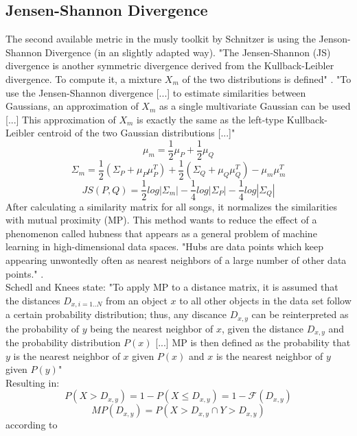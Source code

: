 \subsection{Jensen-Shannon Divergence}
The second available metric in the musly toolkit by Schnitzer is using the Jenson-Shannon Divergence (in an slightly adapted way). "The Jensen-Shannon (JS) divergence is another symmetric divergence derived from the Kullback-Leibler divergence. To compute it, a mixture $X_m$ of the two distributions is defined" \cite[p. 43]{schnitzer1}. "To use the Jensen-Shannon divergence [...] to estimate similarities between Gaussians, an approximation of $X_m$ as a single multivariate Gaussian can be used [...] This approximation of $X_m$ is exactly the same as the left-type Kullback-Leibler centroid of the two Gaussian distributions [...]" \cite[p. 44]{schnitzer1} 
\begin{equation} \label{eq:jsl1}
\mu_m = \frac{1}{2} \mu_P + \frac{1}{2} \mu_Q
\end{equation}
\begin{equation} \label{eq:jsl2}
\Sigma_m = \frac{1}{2} (\Sigma_P + \mu_P\mu_P^T) + \frac{1}{2} (\Sigma_Q + \mu_Q\mu_Q^T) - \mu_m\mu_m^T
\end{equation}
\begin{equation} \label{eq:jsl3}
JS(P, Q) = \frac{1}{2} log|\Sigma_m| - \frac{1}{4} log |\Sigma_P| - \frac{1}{4} log |\Sigma_Q|
\end{equation}
After calculating a similarity matrix for all songs, it normalizes the similarities with mutual proximity (MP). \cite{musly2}  This method wants to reduce the effect of a phenomenon called hubness that appears as a general problem of machine learning in high-dimensional data spaces. "Hubs are data points which keep appearing unwontedly often as nearest neighbors of a large number of other data points." \cite[p. 66]{schnitzer1}.\\
Schedl and Knees state: "To apply MP to a distance matrix, it is assumed that the distances $D_{x,i = 1..N}$ from an object $x$ to all other objects in the data set follow a certain probability distribution; thus, any discance $D_{x,y}$ can be reinterpreted as the probability of $y$ being the nearest neighbor of $x$, given the distance $D_{x,y}$ and the probability distribution $P(x)$ [...] MP is then defined as the probability that $y$ is the nearest neighbor of $x$ given $P(x)$ and $x$ is the nearest neighbor of $y$ given $P(y)$" \cite[p. 80]{knees1}\\
Resulting in: 
\begin{equation} \label{eq:mp1}
P(X > D_{x,y}) = 1 - P(X \leq D_{x,y}) = 1 - \mathscr{F}(D_{x,y}) 
\end{equation}
\begin{equation} \label{eq:mp2}
MP(D_{x,y}) = P(X > D_{x,y} \cap Y > D_{x,y})
\end{equation}
according to \cite[p. 80]{knees1}

